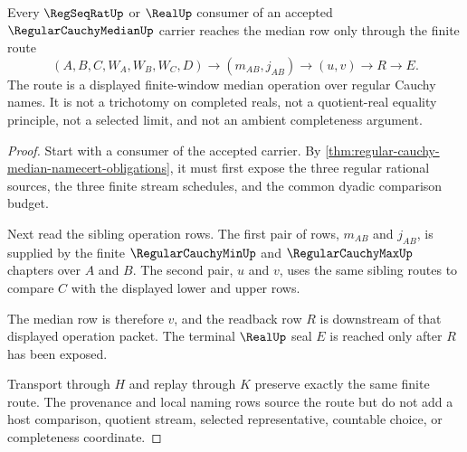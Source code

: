 \begin{theorem}
\label{thm:regular-cauchy-median-finite-window-route}
Every $\RegSeqRatUp$ or $\RealUp$ consumer of an accepted $\RegularCauchyMedianUp$ carrier reaches the median row only through the finite route
$$
(A,B,C,W_A,W_B,W_C,D)
\longrightarrow
(m_{AB},j_{AB})
\longrightarrow
(u,v)
\longrightarrow
R
\longrightarrow
E .
$$
The route is a displayed finite-window median operation over regular Cauchy names. It is not a trichotomy on completed reals, not a quotient-real equality principle, not a selected limit, and not an ambient completeness argument.
\end{theorem}
\begin{proof}
Start with a consumer of the accepted carrier. By \autoref{thm:regular-cauchy-median-namecert-obligations}, it must first expose the three regular rational sources, the three finite stream schedules, and the common dyadic comparison budget.

Next read the sibling operation rows. The first pair of rows, $m_{AB}$ and $j_{AB}$, is supplied by the finite $\RegularCauchyMinUp$ and $\RegularCauchyMaxUp$ chapters over $A$ and $B$. The second pair, $u$ and $v$, uses the same sibling routes to compare $C$ with the displayed lower and upper rows.

The median row is therefore $v$, and the readback row $R$ is downstream of that displayed operation packet. The terminal $\RealUp$ seal $E$ is reached only after $R$ has been exposed.

Transport through $H$ and replay through $K$ preserve exactly the same finite route. The provenance and local naming rows source the route but do not add a host comparison, quotient stream, selected representative, countable choice, or completeness coordinate.
\end{proof}


